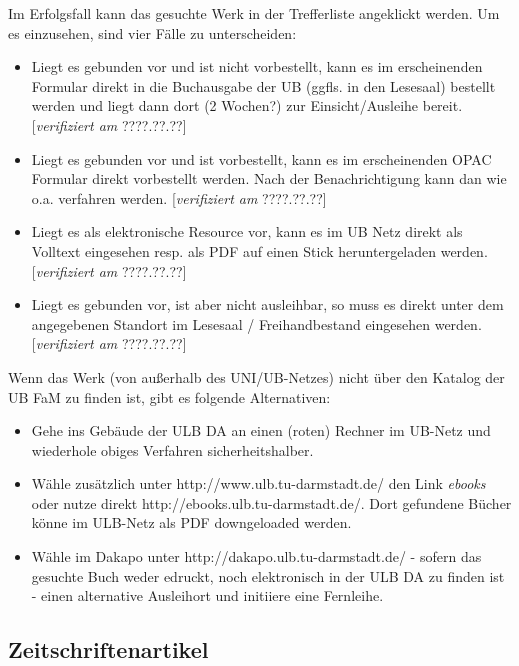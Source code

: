 \documentclass[DIV=calc,BCOR=5mm,11pt,headings=small,oneside,abstract=false, toc=bib]{scrartcl}
\begin{document}
Im Erfolgsfall kann das gesuchte Werk in der Trefferliste angeklickt werden. Um
es einzusehen, sind vier Fälle zu unterscheiden:
\begin{itemize}
  \item Liegt es gebunden vor und ist nicht vorbestellt, kann es im
  erscheinenden Formular direkt in die Buchausgabe der UB (ggfls. in den
  Lesesaal) bestellt werden und liegt dann dort (2 Wochen?) zur
  Einsicht/Ausleihe bereit.  [\emph{verifiziert am} {\ttfamily ????.??.??}]
  \item Liegt es gebunden vor und ist vorbestellt, kann es im erscheinenden OPAC
  Formular direkt vorbestellt werden. Nach der Benachrichtigung kann dan wie
  o.a. verfahren werden.  [\emph{verifiziert am} {\ttfamily ????.??.??}]
  \item Liegt es als elektronische Resource vor, kann es im UB Netz direkt als
  Volltext eingesehen resp. als PDF auf einen Stick heruntergeladen werden. 
  [\emph{verifiziert am} {\ttfamily ????.??.??}]
  \item Liegt es gebunden vor, ist aber nicht ausleihbar, so muss es direkt
  unter dem angegebenen Standort im Lesesaal / Freihandbestand eingesehen werden. 
  [\emph{verifiziert am} {\ttfamily ????.??.??}]
\end{itemize}

Wenn das Werk (von außerhalb des UNI/UB-Netzes) nicht über den Katalog der
UB FaM zu finden ist, gibt es folgende Alternativen:

\begin{itemize}
  \item Gehe ins Gebäude der ULB DA an einen (roten) Rechner im UB-Netz und
  wiederhole obiges Verfahren sicherheitshalber.
  \item Wähle zusätzlich unter {\ttfamily http://www.ulb.tu-darmstadt.de/}
  den Link \emph{ebooks} oder nutze direkt {\ttfamily
  http://ebooks.ulb.tu-darmstadt.de/}. Dort gefundene Bücher könne im ULB-Netz
  als PDF downgeloaded werden.
  \item Wähle im Dakapo unter {\ttfamily http://dakapo.ulb.tu-darmstadt.de/} -
  sofern das gesuchte Buch weder edruckt, noch elektronisch in der ULB DA zu
  finden ist - einen alternative Ausleihort und initiiere eine Fernleihe.
\end{itemize}

\subsection{Zeitschriftenartikel}
\end{document}
